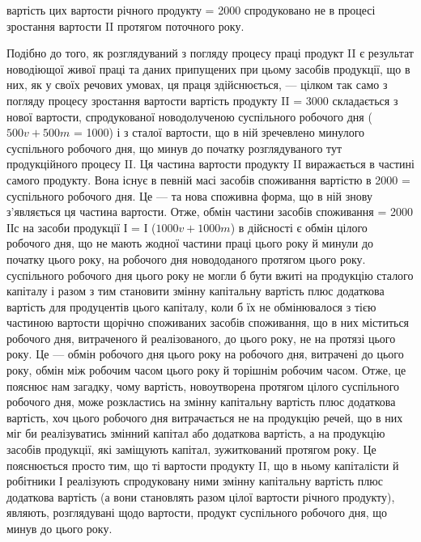 \parcont{}  %
вартість цих  вартости річного продукту = 2000 спродуковано не
в процесі зростання вартости II протягом поточного року.

Подібно до того, як розглядуваний з погляду процесу праці продукт
II є результат новодіющої живої праці та даних припущених при цьому
засобів продукції, що в них, як у своїх речових умовах, ця праця здійснюється,
— цілком так само з погляду процесу зростання вартости вартість
продукту II = 3000 складається з нової вартости, спродукованої новодолученою
 суспільного робочого дня ($500 v + 500m$ = 1000) і з сталої
вартости, що в ній зречевлено  минулого суспільного робочого дня,
що минув до початку розглядуваного тут продукційного процесу II. Ця
частина вартости продукту II виражається в частині самого продукту.
Вона існує в певній масі засобів споживання вартістю в 2000 =  суспільного
робочого дня. Це — та нова споживна форма, що в ній знову
з’являється ця частина вартости. Отже, обмін частини засобів споживання =
2000 ІІс на засоби продукції І = І ($1000 v + 1000 m$) в дійсності є обмін
 цілого робочого дня, що не мають жодної частини праці цього року
й минули до початку цього року, на  робочого дня новододаного протягом
цього року.  суспільного робочого дня цього року не могли б
бути вжиті на продукцію сталого капіталу і разом з тим становити змінну
капітальну вартість плюс додаткова вартість для продуцентів цього капіталу,
коли б їх не обмінювалося з тією частиною вартости щорічно
споживаних засобів споживання, що в них міститься  робочого дня,
витраченого й реалізованого, до цього року, не на протязі цього
року. Це — обмін  робочого дня цього року на  робочого дня,
витрачені до цього року, обмін між робочим часом цього року й
торішнім робочим часом. Отже, це пояснює нам загадку, чому вартість,
новоутворена протягом цілого суспільного робочого дня, може розкластись
на змінну капітальну вартість плюс додаткова вартість, хоч
 цього робочого дня витрачається не на продукцію речей, що в
них міг би реалізуватись змінний капітал або додаткова вартість, а
на продукцію засобів продукції, які заміщують капітал, зужиткований
протягом року. Це пояснюється просто тим, що ті  вартости продукту
II, що в ньому капіталісти й робітники І реалізують спродуковану
ними змінну капітальну вартість плюс додаткова вартість (а вони
становлять разом  цілої вартости річного продукту), являють, розглядувані
щодо вартости, продукт  суспільного робочого дня, що
минув до цього року.

